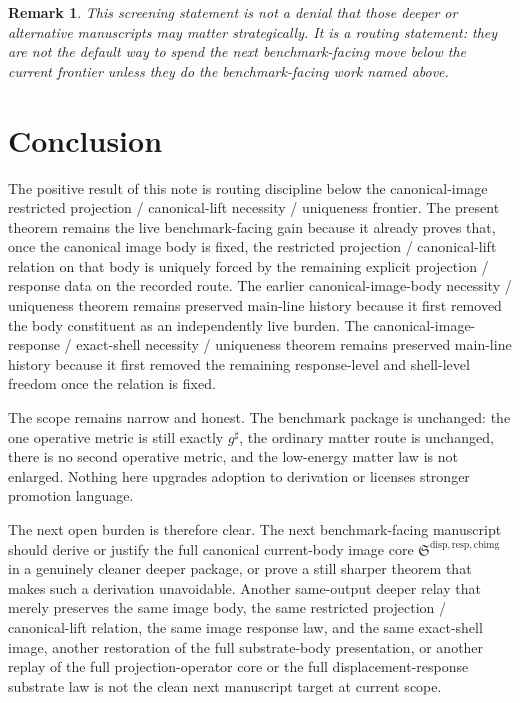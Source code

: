 \documentclass[11pt]{article}
\newcommand{\CompletedMetric}{g^{\sharp}}
\newcommand{\CurrentBodyImageCore}{\mathfrak S^{\mathrm{disp,resp,cbimg}}}
\newtheorem{remark}{Remark}
\begin{document}
\begin{remark}
This screening statement is not a denial that those deeper or alternative manuscripts may matter strategically. It is a routing statement: they are not the default way to spend the next benchmark-facing move below the current frontier unless they do the benchmark-facing work named above.
\end{remark}

\section{Conclusion}

The positive result of this note is routing discipline below the canonical-image restricted projection / canonical-lift necessity / uniqueness frontier. The present theorem remains the live benchmark-facing gain because it already proves that, once the canonical image body is fixed, the restricted projection / canonical-lift relation on that body is uniquely forced by the remaining explicit projection / response data on the recorded route. The earlier canonical-image-body necessity / uniqueness theorem remains preserved main-line history because it first removed the body constituent as an independently live burden. The canonical-image-response / exact-shell necessity / uniqueness theorem remains preserved main-line history because it first removed the remaining response-level and shell-level freedom once the relation is fixed.

The scope remains narrow and honest. The benchmark package is unchanged: the one operative metric is still exactly \(\CompletedMetric\), the ordinary matter route is unchanged, there is no second operative metric, and the low-energy matter law is not enlarged. Nothing here upgrades adoption to derivation or licenses stronger promotion language.

The next open burden is therefore clear. The next benchmark-facing manuscript should derive or justify the full canonical current-body image core \(\CurrentBodyImageCore\) in a genuinely cleaner deeper package, or prove a still sharper theorem that makes such a derivation unavoidable. Another same-output deeper relay that merely preserves the same image body, the same restricted projection / canonical-lift relation, the same image response law, and the same exact-shell image, another restoration of the full substrate-body presentation, or another replay of the full projection-operator core or the full displacement-response substrate law is not the clean next manuscript target at current scope.
\end{document}
